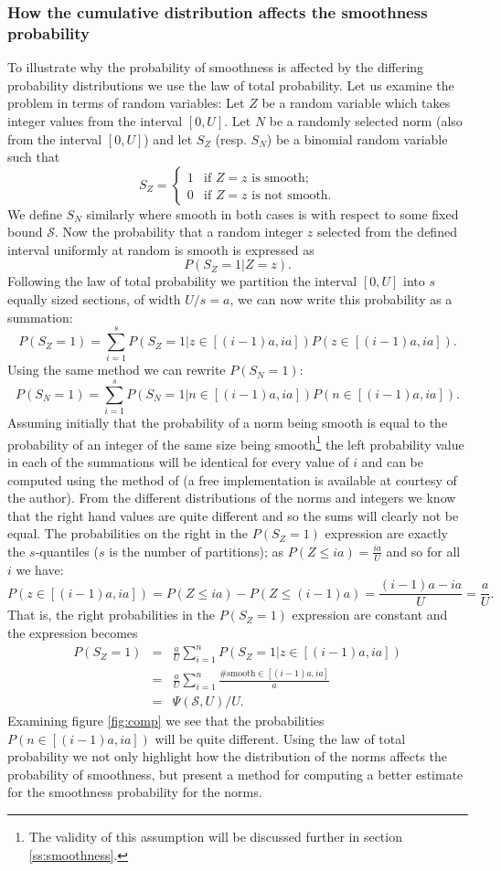 \documentclass[a4paper, 12pt, envcountsect, runningheads]{llncs}
\numberwithin{figure}{section}
\numberwithin{equation}{section}
\begin{document}
\subsubsection*{How the cumulative distribution affects the smoothness probability}
To illustrate why the probability of smoothness is affected by the differing probability distributions we use the law of total probability. Let us examine the problem in terms of random variables: Let $Z$ be a random variable which takes integer values from the interval $[0,U]$. Let $N$ be a randomly selected norm (also from the interval $[0,U]$) and let $S_Z$ (resp. $S_N$) be a binomial random variable such that 
\begin{equation}
S_Z=\left\{\begin{array}{ll}
1 & \mbox{if }Z=z\mbox{ is smooth};\\
0 & \mbox{if }Z=z\mbox{ is not smooth}.
\end{array}\right.
\end{equation}
We define $S_N$ similarly where smooth in both cases is with respect to some fixed bound $\mathcal{S}$. Now the probability that a random integer $z$ selected from the defined interval uniformly at random is smooth is expressed as $$P(S_Z=1| Z=z).$$ Following the law of total probability we partition the interval $[0,U]$ into $s$ equally sized sections, of width $U/s=a$, we can now write this probability as a summation: $$P(S_Z=1)=\sum_{i=1}^{s}P(S_Z=1| z\in[(i-1)a,ia])P(z\in[(i-1)a,ia]).$$ Using the same method we can rewrite $P(S_N=1)$: $$P(S_N=1)=\sum_{i=1}^{s}P(S_N=1| n\in[(i-1)a,ia])P(n\in[(i-1)a,ia]).$$
Assuming initially that the probability of a norm being smooth is equal to the probability of an integer of the same size being smooth\footnote{The validity of this assumption will be discussed further in section \ref{ss:smoothness}.} the left probability value in each of the summations will be identical for every value of $i$ and can be computed using the method of \cite{dan_psi_est} (a free implementation is available at \cite{dan_imp} courtesy of the author). From the different distributions of the norms and integers we know that the right hand values are quite different and so the sums will clearly not be equal. 
The probabilities on the right in the $P(S_Z=1)$ expression are exactly the $s$-quantiles ($s$ is the number of partitions); as $P(Z\leq ia)=\frac{ia}{U}$ and so for all $i$ we have: $$P(z\in[(i-1)a,ia])=P(Z\leq ia)-P(Z\leq (i-1)a)=\frac{(i-1)a-ia}{U}=\frac{a}{U}.$$ That is, the right probabilities in the $P(S_Z=1)$ expression are constant and the expression becomes 
\begin{eqnarray*}
P(S_Z=1)&=&\frac{a}{U}\sum_{i=1}^{n}P(S_Z=1| z\in[(i-1)a,ia])\\
&=&\frac{a}{U}\sum_{i=1}^{n}\frac{\#\mbox{smooth}\in[(i-1)a,ia]}{a}\\
&=&\Psi(\mathcal{S},U)/U.
\end{eqnarray*}
Examining figure \ref{fig:comp} we see that the probabilities $P(n\in[(i-1)a,ia])$ will be quite different. Using the law of total probability we not only highlight how the distribution of the norms affects the probability of smoothness, but present a method for computing a better estimate for the smoothness probability for the norms. 
\end{document}
